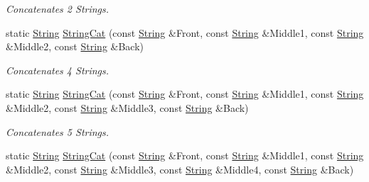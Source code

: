 \begin{DoxyCompactItemize}
\begin{DoxyCompactList}\small\item\em Concatenates 2 Strings. \item\end{DoxyCompactList}\item 
static \hyperlink{namespaceMezzanine_acf9fcc130e6ebf08e3d8491aebcf1c86}{String} \hyperlink{classMezzanine_1_1StringTool_a4e93737cc124804f6d8fb70ece579611}{StringCat} (const \hyperlink{namespaceMezzanine_acf9fcc130e6ebf08e3d8491aebcf1c86}{String} \&Front, const \hyperlink{namespaceMezzanine_acf9fcc130e6ebf08e3d8491aebcf1c86}{String} \&Middle1, const \hyperlink{namespaceMezzanine_acf9fcc130e6ebf08e3d8491aebcf1c86}{String} \&Middle2, const \hyperlink{namespaceMezzanine_acf9fcc130e6ebf08e3d8491aebcf1c86}{String} \&Back)
\begin{DoxyCompactList}\small\item\em Concatenates 4 Strings. \item\end{DoxyCompactList}\item 
static \hyperlink{namespaceMezzanine_acf9fcc130e6ebf08e3d8491aebcf1c86}{String} \hyperlink{classMezzanine_1_1StringTool_a2d622a96cd5ba4c1a220de8d8b1e5334}{StringCat} (const \hyperlink{namespaceMezzanine_acf9fcc130e6ebf08e3d8491aebcf1c86}{String} \&Front, const \hyperlink{namespaceMezzanine_acf9fcc130e6ebf08e3d8491aebcf1c86}{String} \&Middle1, const \hyperlink{namespaceMezzanine_acf9fcc130e6ebf08e3d8491aebcf1c86}{String} \&Middle2, const \hyperlink{namespaceMezzanine_acf9fcc130e6ebf08e3d8491aebcf1c86}{String} \&Middle3, const \hyperlink{namespaceMezzanine_acf9fcc130e6ebf08e3d8491aebcf1c86}{String} \&Back)
\begin{DoxyCompactList}\small\item\em Concatenates 5 Strings. \item\end{DoxyCompactList}\item 
static \hyperlink{namespaceMezzanine_acf9fcc130e6ebf08e3d8491aebcf1c86}{String} \hyperlink{classMezzanine_1_1StringTool_a5a4999eab8853b9b98b2e56f1c7dbc27}{StringCat} (const \hyperlink{namespaceMezzanine_acf9fcc130e6ebf08e3d8491aebcf1c86}{String} \&Front, const \hyperlink{namespaceMezzanine_acf9fcc130e6ebf08e3d8491aebcf1c86}{String} \&Middle1, const \hyperlink{namespaceMezzanine_acf9fcc130e6ebf08e3d8491aebcf1c86}{String} \&Middle2, const \hyperlink{namespaceMezzanine_acf9fcc130e6ebf08e3d8491aebcf1c86}{String} \&Middle3, const \hyperlink{namespaceMezzanine_acf9fcc130e6ebf08e3d8491aebcf1c86}{String} \&Middle4, const \hyperlink{namespaceMezzanine_acf9fcc130e6ebf08e3d8491aebcf1c86}{String} \&Back)

\end{DoxyCompactItemize}

